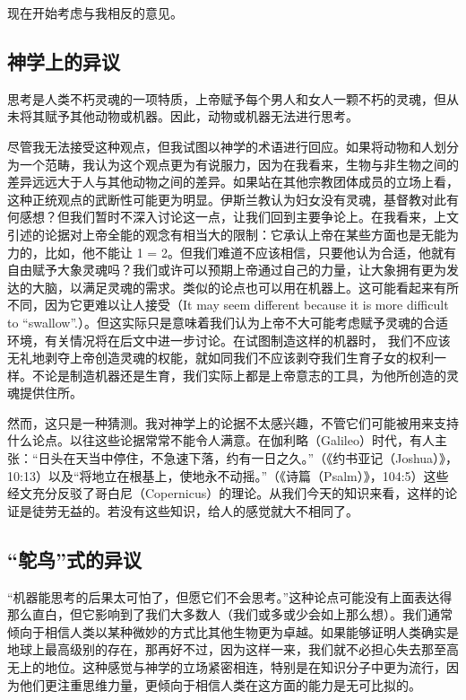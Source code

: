 \documentclass[12pt,a4paper,twoside]{article}
\begin{document}
现在开始考虑与我相反的意见。

\subsection{神学上的异议}
思考是人类不朽灵魂的一项特质，上帝赋予每个男人和女人一颗不朽的灵魂，但从未将其赋予其他动物或机器。因此，动物或机器无法进行思考。

尽管我无法接受这种观点，但我试图以神学的术语进行回应。如果将动物和人划分为一个范畴，我认为这个观点更为有说服力，因为在我看来，生物与非生物之间的差异远远大于人与其他动物之间的差异。如果站在其他宗教团体成员的立场上看，这种正统观点的武断性可能更为明显。伊斯兰教认为妇女没有灵魂，基督教对此有何感想？但我们暂时不深入讨论这一点，让我们回到主要争论上。在我看来，上文引述的论据对上帝全能的观念有相当大的限制：它承认上帝在某些方面也是无能为力的，比如，他不能让 1 = 2。但我们难道不应该相信，只要他认为合适，他就有自由赋予大象灵魂吗？我们或许可以预期上帝通过自己的力量，让大象拥有更为发达的大脑，以满足灵魂的需求。类似的论点也可以用在机器上。这可能看起来有所不同，因为它更难以让人接受（It may seem different because it is more diﬀicult to “swallow”.）。但这实际只是意味着我们认为上帝不大可能考虑赋予灵魂的合适环境，有关情况将在后文中进一步讨论。在试图制造这样的机器时， 我们不应该无礼地剥夺上帝创造灵魂的权能，就如同我们不应该剥夺我们生育子女的权利一样。不论是制造机器还是生育，我们实际上都是上帝意志的工具，为他所创造的灵魂提供住所。

然而，这只是一种猜测。我对神学上的论据不太感兴趣，不管它们可能被用来支持什么论点。以往这些论据常常不能令人满意。在伽利略（Galileo）时代，有人主张：“日头在天当中停住，不急速下落，约有一日之久。”（《约书亚记（Joshua）》，10:13）以及“将地立在根基上，使地永不动摇。”（《诗篇（Psalm）》，104:5）这些经文充分反驳了哥白尼（Copernicus）的理论。从我们今天的知识来看，这样的论证是徒劳无益的。若没有这些知识，给人的感觉就大不相同了。

\subsection{“鸵鸟”式的异议}
“机器能思考的后果太可怕了，但愿它们不会思考。”这种论点可能没有上面表达得那么直白，但它影响到了我们大多数人（我们或多或少会如上那么想）。我们通常倾向于相信人类以某种微妙的方式比其他生物更为卓越。如果能够证明人类确实是地球上最高级别的存在，那再好不过，因为这样一来，我们就不必担心失去那至高无上的地位。这种感觉与神学的立场紧密相连，特别是在知识分子中更为流行，因为他们更注重思维力量，更倾向于相信人类在这方面的能力是无可比拟的。
\end{document}
